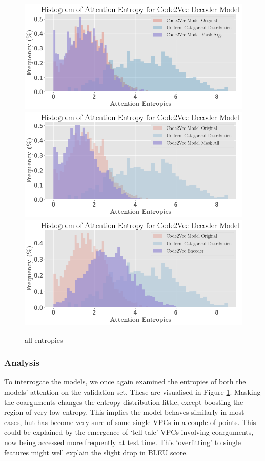 \begin{figure}
\begin{center}
\includegraphics[width=0.8\linewidth]{ImagesCodeRelated/entropies_mask_args.png} 
\includegraphics[width=0.8\linewidth]{ImagesCodeRelated/entropies_mask_all.png}
\includegraphics[width=0.8\linewidth]{ImagesCodeRelated/entropies_encoder.png}
\end{center}
\caption{all entropies}
\label{fig:all_entropies}
\end{figure}


\subsubsection{Analysis} %

To interrogate the models, we once again examined the entropies of both the models' attention on the validation set. These are visualised in Figure \ref{fig:all_entropies}.
Masking the coarguments changes the entropy distribution little, except boosting the region of very low entropy.
This implies the model behaves similarly in most cases, but has become very sure of some single VPCs in a couple of points.
This could be explained by the emergence of `tell-tale' VPCs involving coarguments, now being accessed more frequently at test time.
This `overfitting' to single features might well explain the slight drop in BLEU score.

